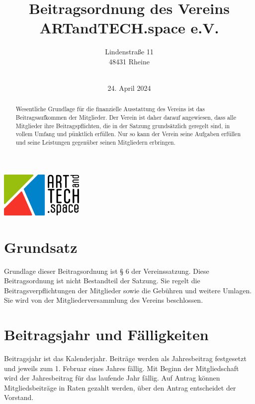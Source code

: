 \documentclass[12pt]{article}
\title{Beitragsordnung des Vereins \\
ARTandTECH.space e.V.}
\author{
	Lindenstraße 11 \\
	48431 Rheine \\
    \
	}
\date{24. April 2024}
\begin{document}
\maketitle
\thispagestyle{empty}

\begin{center}
	\includegraphics[width=0.3\textwidth]{assets/logo.png}
\end{center}

\begin{abstract}
	Wesentliche Grundlage für die finanzielle Ausstattung des Vereins ist das Beitragsaufkommen der Mitglieder.
	Der Verein ist daher darauf angewiesen, dass alle Mitglieder ihre Beitragspflichten, die in der Satzung grundsätzlich
	geregelt sind, in vollem Umfang und pünktlich erfüllen. Nur so kann der Verein seine Aufgaben erfüllen und seine
	Leistungen gegenüber seinen Mitgliedern erbringen.
\end{abstract}
\newpage

\pagestyle{fancy}
\fancyhf{}
\tableofcontents
\thispagestyle{fancy}
\newpage

\setcounter{page}{1}

\section{Grundsatz}
Grundlage dieser Beitragsordnung ist § 6 der Vereinssatzung. Diese Beitragsordnung ist nicht Bestandteil der Satzung.
Sie regelt die Beitragsverpflichtungen der Mitglieder sowie die Gebühren und weitere Umlagen. Sie wird von der
Mitgliederversammlung des Vereins beschlossen.

\section{Beitragsjahr und Fälligkeiten}
Beitragsjahr ist das Kalenderjahr. Beiträge werden als Jahresbeitrag festgesetzt und jeweils zum 1. Februar eines Jahres fällig.
Mit Beginn der Mitgliedschaft wird der Jahresbeitrag für das laufende Jahr fällig.
Auf Antrag können Mitgliedsbeiträge in Raten gezahlt werden, über den Antrag entscheidet der Vorstand.
\end{document}
